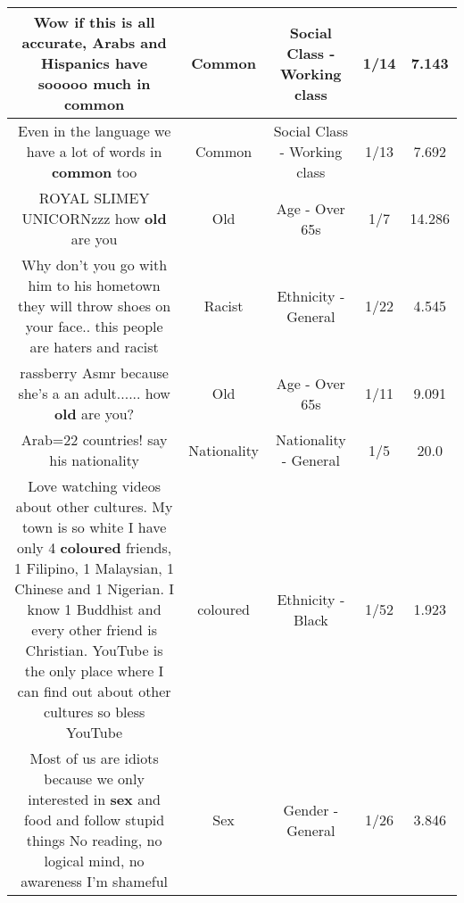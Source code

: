 \documentclass[11pt]{article}
\newlength\mylength
\begin{document}
\begin{center}
\begin{longtable}{|C{.65\mylength}|C{.30\mylength}|C{.12\mylength}|C{.12\mylength}|C{.12\mylength}|}
  \small Wow if this is all accurate, Arabs and Hispanics have sooooo much in common\normalsize   & Common & Social Class - Working class & 1/14 & 7.143 \\  \hline
  \small Even in the language we have a lot of words in \textbf{common} too\normalsize   & Common & Social Class - Working class & 1/13 & 7.692 \\  \hline
  \small ROYAL SLIMEY UNICORNzzz how \textbf{old} are you\normalsize   & Old & Age - Over 65s & 1/7 & 14.286 \\  \hline
  \small Why don't you go with him to his hometown they will throw shoes on your face.. this people are haters and racist\normalsize   & Racist & Ethnicity - General & 1/22 & 4.545 \\  \hline
  \small rassberry Asmr because she's a an adult...... how \textbf{old} are you?\normalsize   & Old & Age - Over 65s & 1/11 & 9.091 \\  \hline
  \small Arab=22 countries!   say his nationality\normalsize   & Nationality & Nationality - General & 1/5 & 20.0 \\  \hline
  \small Love watching videos about other cultures. My town is so white I have only 4 \textbf{coloured} friends, 1 Filipino, 1 Malaysian, 1 Chinese and 1 Nigerian. I know 1 Buddhist and every other friend is Christian. YouTube is the only place where I can find out about other cultures so bless YouTube\normalsize   & coloured & Ethnicity - Black & 1/52 & 1.923 \\  \hline
  \small Most of us are idiots because we only interested in \textbf{sex} and food and follow stupid things No reading,  no logical mind,  no awareness I'm shameful\normalsize   & Sex & Gender - General & 1/26 & 3.846 \\  \hline

\end{longtable}
\end{center}
\end{document}
